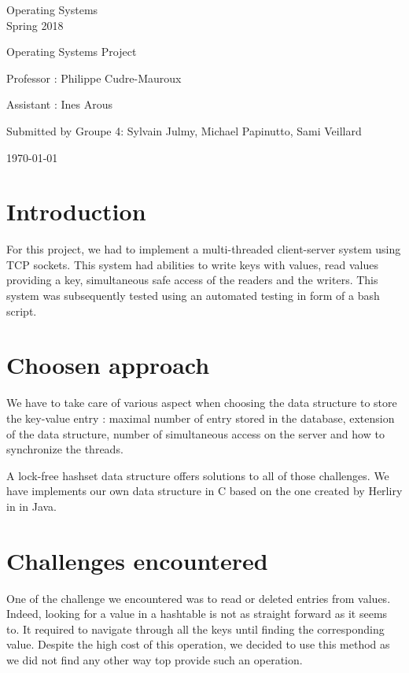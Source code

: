 \documentclass[a4paper,11pt]{report}
\begin{document}
\begin{center}
  \Large{
    Operating Systems\\
    Spring 2018
  }
  
  \noindent\makebox[\linewidth]{\rule{\linewidth}{0.4pt}}
  Operating Systems Project
  \noindent\makebox[\linewidth]{\rule{\linewidth}{0.4pt}}

  \begin{flushleft}
    Professor : Philippe Cudre-Mauroux

    Assistant : Ines Arous
  \end{flushleft}
  
  \noindent\makebox[\linewidth]{\rule{\linewidth}{0.4pt}}

  Submitted by Groupe 4: Sylvain Julmy, Michael Papinutto, Sami Veillard
  
  \noindent\makebox[\linewidth]{\rule{\textwidth}{1pt}}
  \vspace*{0.8cm}
  \today

\end{center}

\newpage

\section*{Introduction}
For this project, we had to implement a multi-threaded client-server system using TCP sockets.
This system had abilities to write keys with values, read values providing a key, simultaneous safe access of the readers and the writers.
This system was subsequently tested using an automated testing in form of a bash script.

\section*{Choosen approach}

We have to take care of various aspect when choosing the data structure to
store the key-value entry : maximal number of entry stored in the database,
extension of the data structure, number of simultaneous access on the server and
how to synchronize the threads.

A lock-free hashset data structure offers solutions to all of those challenges.
We have implements our own data structure in C based on the one created by
Herliry in \cite{Herlihy2006} in Java.

\section*{Challenges encountered}
One of the challenge we encountered was to read or deleted entries from values.
Indeed, looking for a value in a hashtable is not as straight forward as it seems to.
It required to navigate through all the keys until finding the corresponding value.
Despite the high cost of this operation, we decided to use this method as we did not find any other way top provide such an operation.
\end{document}
